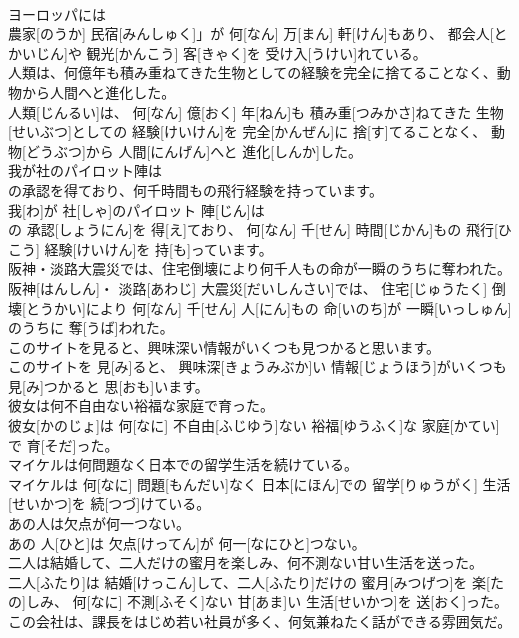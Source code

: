\documentclass[8pt]{extreport}
\begin{document}
\begin{CJK}{UTF8}{min}
\\	ヨーロッパには
\\	農家[のうか] 民宿[みんしゅく]」が 何[なん] 万[まん] 軒[けん]もあり、 都会人[とかいじん]や 観光[かんこう] 客[きゃく]を 受け入[うけい]れている。
\\	人類は、何億年も積み重ねてきた生物としての経験を完全に捨てることなく、動物から人間へと進化した。	
\\	人類[じんるい]は、 何[なん] 億[おく] 年[ねん]も 積み重[つみかさ]ねてきた 生物[せいぶつ]としての 経験[けいけん]を 完全[かんぜん]に 捨[す]てることなく、 動物[どうぶつ]から 人間[にんげん]へと 進化[しんか]した。
\\	我が社のパイロット陣は
\\	の承認を得ており、何千時間もの飛行経験を持っています。	
\\	我[わ]が 社[しゃ]のパイロット 陣[じん]は 
\\	の 承認[しょうにん]を 得[え]ており、 何[なん] 千[せん] 時間[じかん]もの 飛行[ひこう] 経験[けいけん]を 持[も]っています。
\\	阪神・淡路大震災では、住宅倒壊により何千人もの命が一瞬のうちに奪われた。	
\\	阪神[はんしん]・ 淡路[あわじ] 大震災[だいしんさい]では、 住宅[じゅうたく] 倒壊[とうかい]により 何[なん] 千[せん] 人[にん]もの 命[いのち]が 一瞬[いっしゅん]のうちに 奪[うば]われた。
\\	このサイトを見ると、興味深い情報がいくつも見つかると思います。	
\\	このサイトを 見[み]ると、 興味深[きょうみぶか]い 情報[じょうほう]がいくつも 見[み]つかると 思[おも]います。
\\	彼女は何不自由ない裕福な家庭で育った。	
\\	彼女[かのじょ]は 何[なに] 不自由[ふじゆう]ない 裕福[ゆうふく]な 家庭[かてい]で 育[そだ]った。
\\	マイケルは何問題なく日本での留学生活を続けている。	
\\	マイケルは 何[なに] 問題[もんだい]なく 日本[にほん]での 留学[りゅうがく] 生活[せいかつ]を 続[つづ]けている。
\\	あの人は欠点が何一つない。	
\\	あの 人[ひと]は 欠点[けってん]が 何一[なにひと]つない。
\\	二人は結婚して、二人だけの蜜月を楽しみ、何不測ない甘い生活を送った。	
\\	二人[ふたり]は 結婚[けっこん]して、二人[ふたり]だけの 蜜月[みつげつ]を 楽[たの]しみ、 何[なに] 不測[ふそく]ない 甘[あま]い 生活[せいかつ]を 送[おく]った。
\\	この会社は、課長をはじめ若い社員が多く、何気兼ねたく話ができる雰囲気だ。	

\end{CJK}
\end{document}
